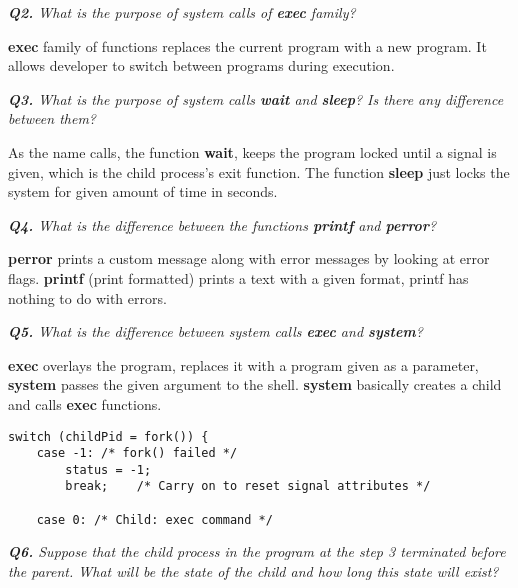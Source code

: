\documentclass[11pt]{article}
\begin{document}
\vspace{3mm}
\textit{\textbf{Q2.} What is the purpose of system calls of \textbf{exec} family?}
\vspace{3mm}

\textbf{exec} family of functions replaces the current program with a new program. It allows developer to switch between programs during execution.

\vspace{5mm}
\textit{\textbf{Q3.} What is the purpose of system calls \textbf{wait} and \textbf{sleep}? Is there any difference between them?}
\vspace{5mm}

As the name calls, the function \textbf{wait}, keeps the program locked until a signal is given, which is the child process's exit function. The function \textbf{sleep} just locks the system for given amount of time in seconds.

\vspace{5mm}
\textit{\textbf{Q4.} What is the difference between the functions \textbf{printf} and \textbf{perror}?}
\vspace{5mm}

\textbf{perror} prints a custom message along with error messages by looking at error flags. \textbf{printf} (print formatted) prints a text with a given format, printf has nothing to do with errors.

\vspace{5mm}
\textit{\textbf{Q5.} What is the difference between system calls \textbf{exec} and \textbf{system}?}
\vspace{5mm}

\textbf{exec} overlays the program, replaces it with a program given as a parameter, \textbf{system} passes the given argument to the shell. \textbf{system} basically creates a child and calls \textbf{exec} functions.

\begin{minipage}{1\textwidth}
\begin{lstlisting}[title=procexec/system.c - The Linux Programming Interface \text{(Listing 27-9, page 586)}, frame=tlrb]
switch (childPid = fork()) {
    case -1: /* fork() failed */
        status = -1;
        break;    /* Carry on to reset signal attributes */

    case 0: /* Child: exec command */
 \end{lstlisting}
\end{minipage}

\vspace{5mm}
\textit{\textbf{Q6.} Suppose that the child process in the program at the step 3 terminated before the parent. What will be the state of the child and how long this state will exist?}
\vspace{5mm}
\end{document}
